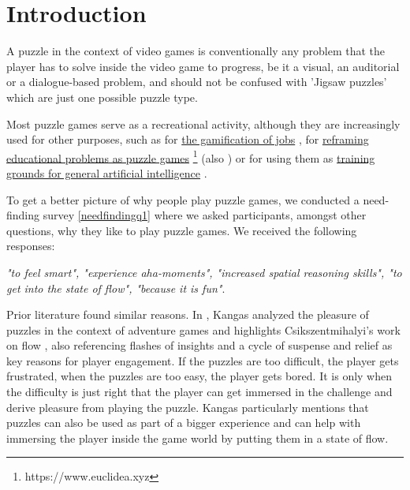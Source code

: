 
\setcounter{chapter}{0}

\chapter{Introduction}
A puzzle in the context of video games is conventionally any problem that the player has to solve inside the video game to progress, be it a visual, an auditorial or a dialogue-based problem, and should not be confused with 'Jigsaw puzzles' which are just one possible puzzle type.

Most puzzle games serve as a recreational activity, although they are increasingly used for other purposes, such as for \href{https://www.theguardian.com/technology/2014/jan/25/online-gamers-solving-sciences-biggest-problems}{the gamification of jobs} \cite{TheGuardian}, for \href{https://www.euclidea.xyz}{reframing educational problems as puzzle games} \footnote{https://www.euclidea.xyz} (also \cite{Lee2014}) or for using them as \href{http://www.gvgai.net}{training grounds for general artificial intelligence} \cite{Perez2014}.

To get a better picture of why people play puzzle games, we conducted a need-finding survey \ref{needfindingq1} where we asked participants, amongst other questions, why they like to play puzzle games. We received the following responses:

\textit{ "to feel smart", "experience aha-moments", "increased spatial reasoning skills", "to get into the state of flow", "because it is fun"}.

Prior literature found similar reasons. In \cite{Kangas2017}, Kangas analyzed the pleasure of puzzles in the context of adventure games and highlights Csikszentmihalyi's work on flow \cite{Csikszentmihalyi}, also referencing flashes of insights and a cycle of suspense and relief as key reasons for player engagement. If the puzzles are too difficult, the player gets frustrated, when the puzzles are too easy, the player gets bored. It is only when the difficulty is just right that the player can get immersed in the challenge and derive pleasure from playing the puzzle. Kangas particularly mentions that puzzles can also be used as part of a bigger experience and can help with immersing the player inside the game world by putting them in a state of flow.




